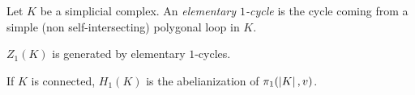 
\begin{definition}
    Let $K$ be a simplicial complex. An \emph{elementary $1$-cycle} is the cycle coming from a simple (non self-intersecting) polygonal loop in $K$.
\end{definition}

\begin{lemma}
    $Z_1(K)$ is generated by elementary $1$-cycles.
\end{lemma}

\begin{theorem}[\textbf{Theorem 33.3}: $H_1(K) = \pi_1^{ab}(\abs{K}, v)$]
    If $K$ is connected, $H_1(K)$ is the abelianization of $\pi_1(\left\lvert {K} \right\rvert, v)$.
\end{theorem}
